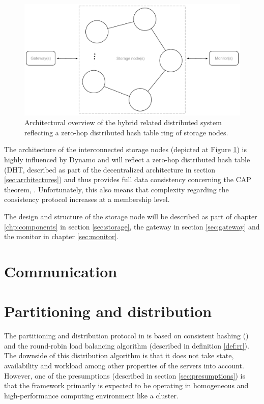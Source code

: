 \begin{figure}[h!]
	\centering
	\includegraphics[scale=0.7]{pdf/architecture-overview.pdf}
	\caption[Architectural overview]{Architectural overview of the hybrid related distributed system reflecting a zero-hop distributed hash table ring of storage nodes. \label{fig:architecture-overview}}
\end{figure}

The architecture of the interconnected storage nodes (depicted at Figure \ref{fig:architecture-overview}) is highly influenced by Dynamo and will reflect a zero-hop distributed hash table (DHT, described as part of the decentralized architecture in section \ref{sec:architectures}) and thus provides full data consistency concerning the CAP theorem, . Unfortunately, this also means that complexity regarding the consistency protocol increases at a membership level.
\newline

The design and structure of the storage node will be described as part of chapter \ref{chp:components} in section \ref{sec:storage}, the gateway in section \ref{sec:gateway} and the monitor in chapter \ref{sec:monitor}.

\section{Communication}


\section{Partitioning and distribution}
The partitioning and distribution protocol in \CodeName is based on consistent hashing () and the round-robin load balancing algorithm (described in definition \ref{def:rr}). The downside of this distribution algorithm is that it does not take state, availability and workload among other properties of the servers into account. However, one of the presumptions (described in section \ref{sec:presumptions}) is that the framework primarily is expected to be operating in homogeneous and high-performance computing environment like a cluster.
\vspace*{3mm}

